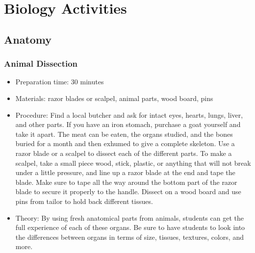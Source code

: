 \chapter{Biology Activities}

\section{Anatomy}

\subsection{Animal Dissection}
\begin{itemize}
\item{Preparation time: 30 minutes}
\item{Materials: razor blades or scalpel, animal parts, wood board, pins}
\item{Procedure: Find a local butcher and ask for intact eyes, hearts, lungs, liver, and other parts. If you have an iron stomach, purchase a goat yourself and take it apart. The meat can be eaten, the organs studied, and the bones buried for a month and then exhumed to give a complete skeleton. Use a razor blade or a scalpel to dissect each of the different parts. To make a scalpel, take a small piece wood, stick, plastic, or anything that will not break under a little pressure, and line up a razor blade at the end and tape the blade. Make sure to tape all the way around the bottom part of the razor blade to secure it properly to the handle. Dissect on a wood board and use pins from tailor to hold back different tissues.}
\item{Theory: By using fresh anatomical parts from animals, students can get the full experience of each of these organs. Be sure to have students to look into the differences between organs in terms of size, tissues, textures, colors, and more.}
\end{itemize}

